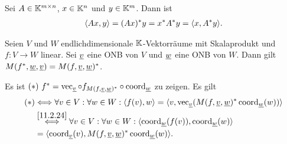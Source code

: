 \documentclass[../../main.tex]{subfiles}
\begin{document}
\begin{lem}\label{15.1.8}
Sei $A\in \K^{m\times n}$, $x\in \K^n$ und $y\in \K^m$. Dann ist
\begin{align*}
\scal{Ax,y}=(Ax)^*y=x^*A^*y=\scal{x,A^*y}.
\end{align*}
\end{lem}

\begin{pro}\label{15.1.9}
Seien $V$ und $W$ endlichdimensionale $\K$-Vektorräume mit Skalaprodukt und $f: V\to W$ linear. Sei $\v$ eine ONB von $V$ und $\w$ eine ONB von $W$. Dann gilt $M(f^*,\w,\v)=M(f,\v,\w)^*$.
\end{pro}
\begin{cproof}
Es ist $(*)\ f^*=\ve_{\v}\circ f_{M(f,\v,\w)^*}\circ \co_{\w}$ zu zeigen. Es gilt
\begin{align*}
(*)&\Longleftrightarrow \forall v\in V:\forall w\in W: \scal{f(v),w}=\scal{v,\ve_{\v}(M(f,\v,\w)^* \co_{\w}(w))}\\
&\stackrel{\ref{11.2.24}}{\Longleftrightarrow}\forall v\in V:\forall w\in W: \scal{\co_{\w}(f(v)),\co_{\w}(w)}\\
&=\scal{\co_{\v}(v), M(f,\v,\w)^* \co_{\w}(w)}.
\end{align*}
\end{cproof}
\end{document}
